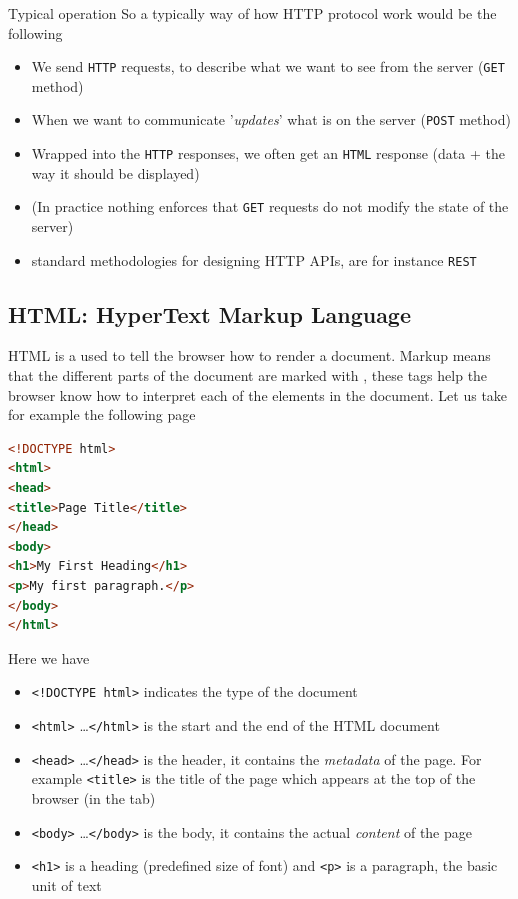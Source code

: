 \begin{parag}{Typical operation}
    So a typically way of how HTTP protocol work would be the following
	\begin{itemize}
	    \item We send \texttt{HTTP} requests, to describe what we want to see from the server (\texttt{GET} method)
	    \item When we want to communicate '\textit{updates}' what is on the server (\texttt{POST} method)
	    \item Wrapped into the \texttt{HTTP} responses, we often get an \texttt{HTML} response (data + the way it should be displayed)
	    \item (In practice nothing enforces that \texttt{GET} requests do not modify the state of the server)
	    \item standard methodologies for designing HTTP APIs, are for instance \texttt{REST}
	\end{itemize}
	
\end{parag}


\subsection{HTML: HyperText Markup Language}
HTML is a  used to tell the browser how to render a document. Markup means that the different parts of the document are marked with , these tags help the browser know how to interpret each of the elements in the document. Let us take for example the following page
\begin{lstlisting}[language=HTML]
<!DOCTYPE html>
<html>
<head>
<title>Page Title</title>
</head>
<body>
<h1>My First Heading</h1>
<p>My first paragraph.</p>
</body>
</html>
\end{lstlisting}
Here we have
\begin{itemize}
    \item \texttt{<!DOCTYPE html>} indicates the type of the document
    \item \texttt{<html>} \dots \texttt{</html>} is the start and the end of the HTML document
    \item \texttt{<head>} \dots \texttt{</head>} is the header, it contains the \textit{metadata} of the page. For example \texttt{<title>} is the title of the page which appears at the top of the browser (in the tab)
    \item \texttt{<body>} \dots \texttt{</body>} is the body, it contains the actual \textit{content} of the page
    \item \texttt{<h1>} is a heading (predefined size of font) and \texttt{<p>} is a paragraph, the basic unit of text
\end{itemize}

